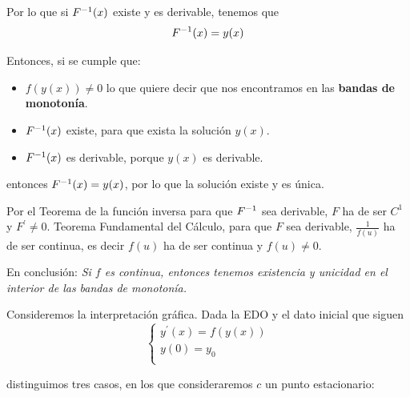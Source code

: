 \documentclass{mathnotes}
\begin{document}
Por lo que si $F^{-1}(x)$ existe y es derivable, tenemos que $$F^{-1}(x) = y(x)$$

Entonces, si se cumple que:
\begin{itemize}
\item $f(y(x))\neq 0$ lo que quiere decir que nos encontramos en las \textbf{bandas de monotonía}.
\item $F^{-1} (x)$ existe, para que exista la solución $y(x)$.
\item $F^{-1} (x)$ es derivable, porque $y(x)$ es derivable. 
\end{itemize}
entonces $F^{-1}(x) = y(x)$, por lo que la solución existe y es única.

Por el Teorema de la función inversa para que $F^{-1}$ sea derivable, $F$ ha de ser $C^1$ y $F^\prime\neq 0$. Teorema Fundamental del Cálculo, para que $F$ sea derivable, $\frac{1}{f(u)}$ ha de ser continua, es decir $f(u)$ ha de ser continua y $f(u)\neq 0$.

En conclusión:
\textit{Si $f$ es continua, entonces tenemos existencia y unicidad en el interior de las bandas de monotonía.}

Consideremos la interpretación gráfica. Dada la EDO y el dato inicial que siguen 
\begin{equation*}
  \left\lbrace
  \begin{array}{l}
     y^\prime(x) = f(y(x)) \\
     y(0) = y_0  \\
  \end{array}
  \right.
\end{equation*}

distinguimos tres casos, en los que consideraremos $c$ un punto estacionario:

\end{document}
